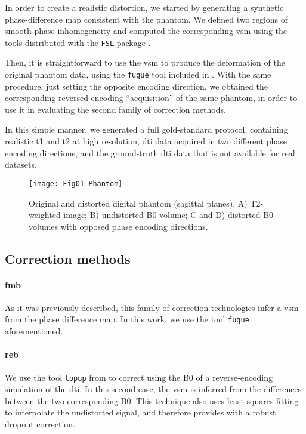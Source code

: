 In order to create a realistic distortion, we started
by generating a synthetic phase-difference map 
consistent with the phantom.  We defined two regions 
of smooth phase inhomogeneity and computed the 
corresponding \gls*{vsm} using the tools distributed 
with the \texttt{FSL} package \cite{jenkinson_fsl_2012}.

Then, it is straightforward to use the \gls*{vsm} to 
produce the deformation of the original phantom data,
using the \texttt{fugue} tool included in
\cite{jenkinson_fsl_2012}. With the same procedure,
just setting the opposite encoding direction, we obtained
the corresponding reversed encoding ``acquisition'' of
the same phantom, in order to use it in evaluating the
second family of correction methods.

In this simple manner, we generated a full gold-standard
protocol, containing realistic \gls*{t1} and \gls*{t2}
at high resolution, \gls*{dti} data acquired in two
different phase encoding directions, and the ground-truth
\gls*{dti} data that is not available for real datasets.


\begin{figure}[thpb]
   \centering
   \texttt{[image: Fig01-Phantom]}
   \caption{Original and distorted digital phantom (sagittal
   planes). A) T2-weighted image; B) undistorted B0 volume;
   C and D) distorted B0 volumes with opposed phase encoding 
   directions.}
   \label{fig:label}
\end{figure}

\subsection{Correction methods}

\paragraph{\Gls*{fmb}} As it was previously described,
this family of correction technologies infer a \gls*{vsm}
from the phase difference map. In this work, we use the
tool \texttt{fugue} \cite{jenkinson_fsl_2012} aforementioned.

\paragraph{\Gls*{reb}} We use the tool
\texttt{topup} from \cite{jenkinson_fsl_2012} to correct
using the B0 of a reverse-encoding simulation of the \gls*{dti}.
In this second case, the \gls*{vsm} is inferred from the
differences between the two corresponding B0. This technique
also uses least-squares-fitting to interpolate the undistorted
signal, and therefore provides with a robust dropout correction.

